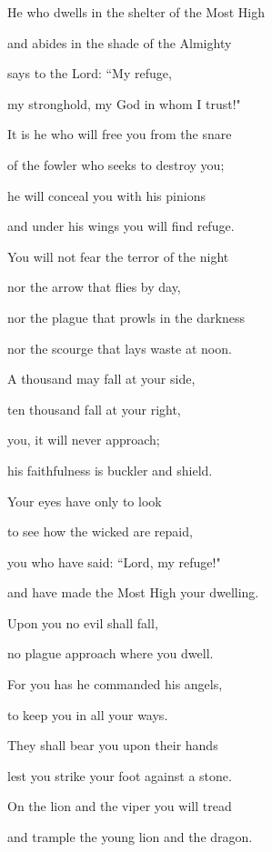 \noindent He who dwells in the shelter of the Most High~\GreStar{}~\nopagebreak

and abides in the shade of the Almighty

\noindent says to the Lord: ``My refuge,~\GreStar{}~\nopagebreak

my stronghold, my God in whom I trust!"

\noindent It is he who will free you from the snare~\GreStar{}~\nopagebreak

of the fowler who seeks to destroy you;

\noindent he will conceal you with his pinions~\GreStar{}~\nopagebreak

and under his wings you will find refuge.

\noindent You will not fear the terror of the night~\GreStar{}~\nopagebreak

nor the arrow that flies by day,

\noindent nor the plague that prowls in the darkness~\GreStar{}~\nopagebreak

nor the scourge that lays waste at noon.

\noindent A thousand may fall at your side,~\GreStar{}~\nopagebreak

ten thousand fall at your right,

\noindent you, it will never approach;~\GreStar{}~\nopagebreak

his faithfulness is buckler and shield.

\noindent Your eyes have only to look~\GreStar{}~\nopagebreak

to see how the wicked are repaid,

\noindent you who have said: ``Lord, my refuge!"~\GreStar{}~\nopagebreak

and have made the Most High your dwelling.

\noindent Upon you no evil shall fall,~\GreStar{}~\nopagebreak

no plague approach where you dwell.

\noindent For you has he commanded his angels,~\GreStar{}~\nopagebreak

to keep you in all your ways.

\noindent They shall bear you upon their hands~\GreStar{}~\nopagebreak

lest you strike your foot against a stone.

\noindent On the lion and the viper you will tread~\GreStar{}~\nopagebreak

and trample the young lion and the dragon.

